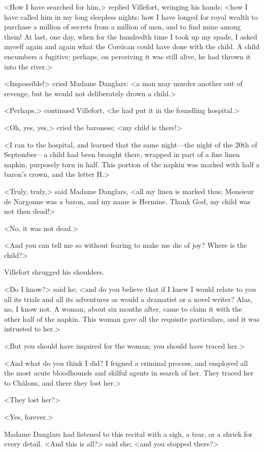  <How I have searched for him,> replied Villefort, wringing his hands; <how I have called him in my long sleepless nights; how I have longed for royal wealth to purchase a million of secrets from a million of men, and to find mine among them! At last, one day, when for the hundredth time I took up my spade, I asked myself again and again what the Corsican could have done with the child. A child encumbers a fugitive; perhaps, on perceiving it was still alive, he had thrown it into the river.> 

 <Impossible!> cried Madame Danglars: <a man may murder another out of revenge, but he would not deliberately drown a child.> 

 <Perhaps,> continued Villefort, <he had put it in the foundling hospital.> 

 <Oh, yes, yes,> cried the baroness; <my child is there!> 

 <I ran to the hospital, and learned that the same night—the night of the 20th of September—a child had been brought there, wrapped in part of a fine linen napkin, purposely torn in half. This portion of the napkin was marked with half a baron's crown, and the letter H.> 

 <Truly, truly,> said Madame Danglars, <all my linen is marked thus; Monsieur de Nargonne was a baron, and my name is Hermine. Thank God, my child was not then dead!> 

 <No, it was not dead.> 

 <And you can tell me so without fearing to make me die of joy? Where is the child?> 

 Villefort shrugged his shoulders. 

 <Do I know?> said he; <and do you believe that if I knew I would relate to you all its trials and all its adventures as would a dramatist or a novel writer? Alas, no, I know not. A woman, about six months after, came to claim it with the other half of the napkin. This woman gave all the requisite particulars, and it was intrusted to her.> 

 <But you should have inquired for the woman; you should have traced her.> 

 <And what do you think I did? I feigned a criminal process, and employed all the most acute bloodhounds and skilful agents in search of her. They traced her to Châlons, and there they lost her.> 

 <They lost her?> 

 <Yes, forever.> 

 Madame Danglars had listened to this recital with a sigh, a tear, or a shriek for every detail. <And this is all?> said she; <and you stopped there?> 


